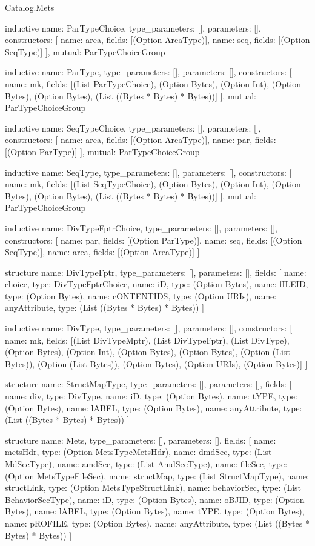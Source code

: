 \begin{lexlean}{Catalog.Mets}
\begin{semanticmodule}
inductive{
  name: ParTypeChoice,
  type_parameters: [],
  parameters: [],
  constructors: [
    {name: area, fields: [(Option AreaType)]},
    {name: seq, fields: [(Option SeqType)]}
  ],
  mutual: ParTypeChoiceGroup
}

inductive{
  name: ParType,
  type_parameters: [],
  parameters: [],
  constructors: [
    {name: mk, fields: [(List ParTypeChoice), (Option Bytes), (Option Int), (Option Bytes), (Option Bytes), (List ((Bytes * Bytes) * Bytes))]}
  ],
  mutual: ParTypeChoiceGroup
}

inductive{
  name: SeqTypeChoice,
  type_parameters: [],
  parameters: [],
  constructors: [
    {name: area, fields: [(Option AreaType)]},
    {name: par, fields: [(Option ParType)]}
  ],
  mutual: ParTypeChoiceGroup
}

inductive{
  name: SeqType,
  type_parameters: [],
  parameters: [],
  constructors: [
    {name: mk, fields: [(List SeqTypeChoice), (Option Bytes), (Option Int), (Option Bytes), (Option Bytes), (List ((Bytes * Bytes) * Bytes))]}
  ],
  mutual: ParTypeChoiceGroup
}

inductive{
  name: DivTypeFptrChoice,
  type_parameters: [],
  parameters: [],
  constructors: [
    {name: par, fields: [(Option ParType)]},
    {name: seq, fields: [(Option SeqType)]},
    {name: area, fields: [(Option AreaType)]}
  ]
}

structure{
  name: DivTypeFptr,
  type_parameters: [],
  parameters: [],
  fields: [
    {name: choice, type: DivTypeFptrChoice},
    {name: iD, type: (Option Bytes)},
    {name: fILEID, type: (Option Bytes)},
    {name: cONTENTIDS, type: (Option URIs)},
    {name: anyAttribute, type: (List ((Bytes * Bytes) * Bytes))}
  ]
}

inductive{
  name: DivType,
  type_parameters: [],
  parameters: [],
  constructors: [
    {name: mk, fields: [(List DivTypeMptr), (List DivTypeFptr), (List DivType), (Option Bytes), (Option Int), (Option Bytes), (Option Bytes), (Option (List Bytes)), (Option (List Bytes)), (Option Bytes), (Option URIs), (Option Bytes)]}
  ]
}

structure{
  name: StructMapType,
  type_parameters: [],
  parameters: [],
  fields: [
    {name: div, type: DivType},
    {name: iD, type: (Option Bytes)},
    {name: tYPE, type: (Option Bytes)},
    {name: lABEL, type: (Option Bytes)},
    {name: anyAttribute, type: (List ((Bytes * Bytes) * Bytes))}
  ]
}

structure{
  name: Mets,
  type_parameters: [],
  parameters: [],
  fields: [
    {name: metsHdr, type: (Option MetsTypeMetsHdr)},
    {name: dmdSec, type: (List MdSecType)},
    {name: amdSec, type: (List AmdSecType)},
    {name: fileSec, type: (Option MetsTypeFileSec)},
    {name: structMap, type: (List StructMapType)},
    {name: structLink, type: (Option MetsTypeStructLink)},
    {name: behaviorSec, type: (List BehaviorSecType)},
    {name: iD, type: (Option Bytes)},
    {name: oBJID, type: (Option Bytes)},
    {name: lABEL, type: (Option Bytes)},
    {name: tYPE, type: (Option Bytes)},
    {name: pROFILE, type: (Option Bytes)},
    {name: anyAttribute, type: (List ((Bytes * Bytes) * Bytes))}
  ]
}


\end{semanticmodule}
\end{lexlean}
